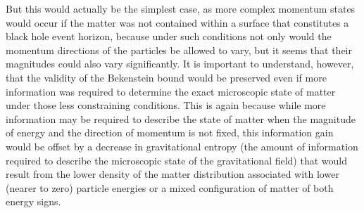 \documentclass[notitlepage,12pt]{report}
\begin{document}
But this would actually be the simplest case, as more complex momentum states would occur if the matter was not contained within a surface that constitutes a black hole event horizon, because under such conditions not only would the momentum directions of the particles be allowed to vary, but it seems that their magnitudes could also vary significantly. It is important to understand, however, that the validity of the Bekenstein bound would be preserved even if more information was required to determine the exact microscopic state of matter under those less constraining conditions. This is again because while more information may be required to describe the state of matter when the magnitude of energy and the direction of momentum is not fixed, this information gain would be offset by a decrease in gravitational entropy (the amount of information required to describe the microscopic state of the gravitational field) that would result from the lower density of the matter distribution associated with lower (nearer to zero) particle energies or a mixed configuration of matter of both energy signs.
\end{document}
